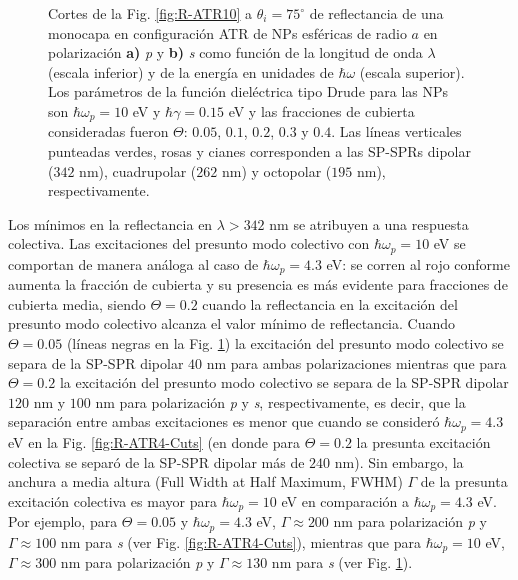 \begin{figure}[h!]
	\caption{Cortes de la Fig. \ref{fig:R-ATR10} a $\theta_i = 75^\circ$ de reflectancia de una monocapa en configuración ATR de NPs esféricas de radio $a$ en polarización \textbf{a)} \emph{p} y \textbf{b)} \emph{s} como función de la longitud de onda $\lambda$ (escala inferior) y de la energía en unidades de $\hbar\omega$ (escala superior). Los parámetros de la función dieléctrica tipo Drude para las NPs son $\hbar\omega_p = 10$ eV y $\hbar\gamma = 0.15$ eV y las fracciones de cubierta consideradas fueron $\Theta$: $0. 05$, $0. 1$, $0. 2$, $0. 3$ y $0. 4$. Las líneas verticales punteadas verdes, rosas y cianes corresponden a las SP-SPRs dipolar ($342$ nm), cuadrupolar ($262$ nm) y octopolar ($195$ nm), respectivamente.  }\label{fig:R-ATR10-Cuts}
	\end{figure}	

Los mínimos en la reflectancia en $\lambda > 342$ nm se atribuyen a una respuesta colectiva. Las excitaciones del presunto modo colectivo con $\hbar\omega_p = 10$ eV se comportan de manera análoga al caso de $\hbar\omega_p = 4.3$ eV: se corren al rojo conforme aumenta la fracción de cubierta y su presencia es más evidente para fracciones de cubierta media, siendo  $\Theta=0.2$ cuando la reflectancia en la excitación del presunto modo colectivo alcanza el valor mínimo de reflectancia. Cuando $\Theta = 0.05$ (líneas negras en la Fig. \ref{fig:R-ATR10-Cuts}) la excitación del presunto modo colectivo se separa de la SP-SPR dipolar   $40$ nm para ambas polarizaciones mientras que para $\Theta = 0.2$ la excitación del presunto modo colectivo se separa de la SP-SPR dipolar  $120$ nm y $100$ nm para polarización \emph{p} y \emph{s}, respectivamente, es decir, que la separación entre ambas excitaciones es menor que cuando se consideró $\hbar\omega_p = 4.3$ eV en la Fig. \ref{fig:R-ATR4-Cuts} (en donde para $\Theta=0.2$ la presunta excitación colectiva se separó de la SP-SPR dipolar más de $240$ nm). Sin embargo, la anchura a media altura (Full Width at Half Maximum, FWHM) $\Gamma$ de la presunta excitación colectiva es mayor para $\hbar\omega_p=10$ eV en comparación a $\hbar\omega_p=4.3$ eV. Por ejemplo, para $\Theta = 0.05$ y $\hbar\omega_p = 4.3$ eV,  $\Gamma\approx 200$ nm para polarización \emph{p} y  $\Gamma\approx 100$ nm para  \emph{s} (ver Fig. \ref{fig:R-ATR4-Cuts}), mientras que para  $\hbar\omega_p = 10$ eV,  $\Gamma\approx 300$ nm para polarización \emph{p} y  $\Gamma\approx 130$ nm para  \emph{s} (ver Fig. \ref{fig:R-ATR10-Cuts}).

